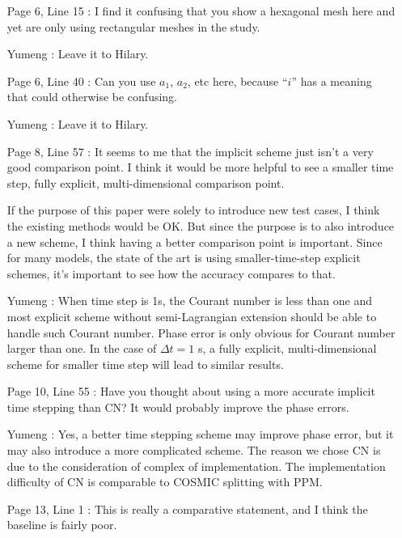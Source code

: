 \documentclass[12pt]{article}
\begin{document}
\begin{enumerate}
\item [Page 6, Line 15]: I find it confusing that you show a hexagonal mesh here and yet are only using rectangular meshes in the study.

\item [Yumeng]: Leave it to Hilary.

\item [Page 6, Line 40]: Can you use $a_1$, $a_2$, etc here, because ``$i$'' has a meaning that could otherwise be confusing.

\item [Yumeng]: Leave it to Hilary.

\item [Page 8, Line 57]: It seems to me that the implicit scheme just isn't a very good comparison point. I think it would be more helpful to see a smaller time step, fully explicit, multi-dimensional comparison point.

If the purpose of this paper were solely to introduce new test cases, I think the existing methods would be OK. But since the purpose is to also introduce a new scheme, I think having a better comparison point is important. Since for many models, the state of the art is using smaller-time-step explicit schemes, it's important to see how the accuracy compares to that.

\item [Yumeng]: When time step is 1s, the Courant number is less than one and most explicit scheme without semi-Lagrangian extension should be able to handle such Courant number. Phase error is only obvious for Courant number larger than one. In the case of $\Delta t = 1$ s, a fully explicit, multi-dimensional scheme for smaller time step will lead to similar results. 

\item [Page 10, Line 55]: Have you thought about using a more accurate implicit time stepping than CN? It would probably improve the phase errors.

\item [Yumeng]: Yes, a better time stepping scheme may improve phase error, but it may also introduce a more complicated scheme. The reason we chose CN is due to the consideration of complex of implementation. The implementation difficulty of CN is comparable to COSMIC splitting with PPM. 

\item [Page 13, Line 1]: This is really a comparative statement, and I think the baseline is fairly poor.


\end{enumerate}
\end{document}
